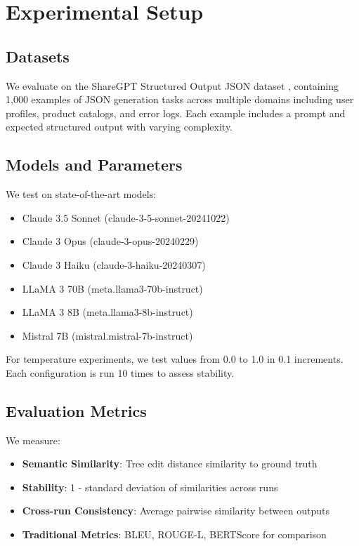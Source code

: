 \documentclass[letterpaper]{article} %
\begin{document}
\section{Experimental Setup}

\subsection{Datasets}

We evaluate on the ShareGPT Structured Output JSON dataset \cite{Arun2023}, containing 1,000 examples of JSON generation tasks across multiple domains including user profiles, product catalogs, and error logs. Each example includes a prompt and expected structured output with varying complexity.

\subsection{Models and Parameters}

We test on state-of-the-art models:
\begin{itemize}
\item Claude 3.5 Sonnet (claude-3-5-sonnet-20241022)
\item Claude 3 Opus (claude-3-opus-20240229)
\item Claude 3 Haiku (claude-3-haiku-20240307)
\item LLaMA 3 70B (meta.llama3-70b-instruct)
\item LLaMA 3 8B (meta.llama3-8b-instruct)
\item Mistral 7B (mistral.mistral-7b-instruct)
\end{itemize}

For temperature experiments, we test values from 0.0 to 1.0 in 0.1 increments. Each configuration is run 10 times to assess stability.

\subsection{Evaluation Metrics}

We measure:
\begin{itemize}
\item \textbf{Semantic Similarity}: Tree edit distance similarity to ground truth
\item \textbf{Stability}: 1 - standard deviation of similarities across runs
\item \textbf{Cross-run Consistency}: Average pairwise similarity between outputs
\item \textbf{Traditional Metrics}: BLEU, ROUGE-L, BERTScore for comparison
\end{itemize}
\end{document}
